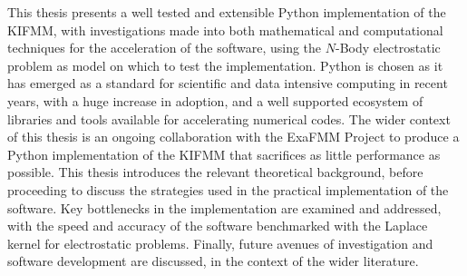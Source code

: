 This thesis presents a well tested and extensible Python implementation of the KIFMM,
with investigations made into both mathematical and computational
techniques for the acceleration of the software, using the $N$-Body electrostatic
problem as model on which to test the implementation. Python is chosen as it has emerged as a standard
for scientific and data intensive computing in recent years, with a huge increase
in adoption, and a well supported ecosystem of libraries and tools available for
accelerating numerical codes. The wider context of this thesis
is an ongoing collaboration with the ExaFMM Project \cite{exafmm} to produce a Python
implementation of the KIFMM that sacrifices as little performance as possible.
This thesis introduces the relevant theoretical background, before
proceeding to discuss the strategies used in the practical implementation of the
software. Key bottlenecks in the implementation are examined and addressed, with the speed
and accuracy of the software benchmarked with the Laplace kernel for electrostatic problems.
Finally, future avenues of investigation and software development are discussed, in the context
of the wider literature.
